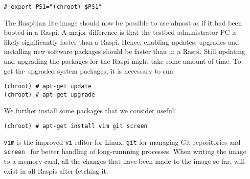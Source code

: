 \begin{lstlisting}[]
# export PS1="(chroot) $PS1"
\end{lstlisting}
\FloatBarrier
\vspace{-5mm}

The Raspbian lite image should now be possible to use almost as if it had
been booted in a \ac{Raspi}. A major difference is that the testbed
administrator \ac{PC} is likely significantly faster than a \ac{Raspi}.
Hence, enabling updates, upgrades and installing new software packages
should be faster than in a \ac{Raspi}. Still updating and upgrading
the packages for the \ac{Raspi} might take some amount of time. To get
the upgraded system packages, it is necessary to run:

\begin{lstlisting}[]
(chroot) # apt-get update
(chroot) # apt-get upgrade
\end{lstlisting}
\FloatBarrier
\vspace{-5mm}

We further install some packages that we consider useful:
\begin{lstlisting}[]
(chroot) # apt-get install vim git screen
\end{lstlisting}
\FloatBarrier
\vspace{-5mm}

\texttt{vim} is the improved \texttt{vi} editor for Linux, \texttt{git}
for managing Git repositories and \texttt{screen}~\cite{gnu_screen} for better handling of
long-runnning processes. When writing the image to a memory card, all the
changes that have been made to the image so far, will exist in all
\ac{Raspi}s after fetching it.
